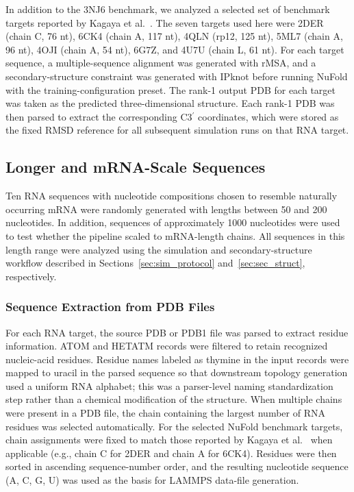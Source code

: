 In addition to the 3NJ6 benchmark, we analyzed a selected set of benchmark
targets reported by Kagaya et al.~\cite{Kagaya2025}. The seven targets used
here were 2DER (chain C, 76 nt), 6CK4 (chain A, 117 nt), 4QLN (rp12, 125 nt),
5ML7 (chain A, 96 nt), 4OJI (chain A, 54 nt), 6G7Z, and 4U7U (chain L,
61 nt). For each target sequence, a multiple-sequence alignment was generated
with rMSA, and a secondary-structure constraint was generated with
IPknot before running NuFold with the training-configuration preset. The
rank-1 output PDB for each target was taken as the predicted three-dimensional
structure. Each rank-1 PDB was then parsed to extract the corresponding
C3$^\prime$ coordinates, which were stored as the fixed RMSD reference for all
subsequent simulation runs on that RNA target.


\subsection{Longer and mRNA-Scale Sequences}
\label{sec:longer_seqs}

Ten RNA sequences with nucleotide compositions chosen to resemble naturally
occurring mRNA were randomly generated with lengths between 50 and 200
nucleotides. In addition, sequences of approximately 1000 nucleotides were
used to test whether the pipeline scaled to mRNA-length chains. All sequences
in this length range were analyzed using the simulation and secondary-structure
workflow described in Sections~\ref{sec:sim_protocol} and~\ref{sec:sec_struct},
respectively.


\subsubsection{Sequence Extraction from PDB Files}

For each RNA target, the source PDB or PDB1 file was parsed to extract residue
information. ATOM and HETATM records were filtered to retain recognized
nucleic-acid residues. Residue names labeled as thymine in the input records
were mapped to uracil in the parsed sequence so that downstream topology
generation used a uniform RNA alphabet; this was a parser-level naming
standardization step rather than a chemical modification of the structure.
When multiple chains were present in a PDB file, the chain containing the
largest number of RNA residues was selected automatically. For the selected
NuFold benchmark targets, chain assignments were fixed to match those reported
by Kagaya et al.~\cite{Kagaya2025} when applicable (e.g., chain C for 2DER
and chain A for 6CK4). Residues were then sorted in ascending sequence-number
order, and the resulting nucleotide sequence (A, C, G, U) was used as the
basis for LAMMPS data-file generation.

